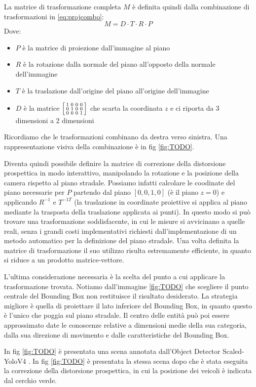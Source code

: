 La matrice di trasformazione completa $M$ è definita quindi dalla combinazione di trasformazioni in \ref{eq:projcombo}:
\begin{equation}
    \label{eq:projcombo}
    M = D \cdot T \cdot R \cdot P
\end{equation}
Dove:
\begin{itemize}
    \item $P$ è la matrice di proiezione dall'immagine al piano
    \item $R$ è la rotazione dalla normale del piano all'opposto della normale dell'immagine
    \item $T$ è la traslazione dall'origine del piano all'origine dell'immagine
    \item $D$ è la matrice 
    $
    \begin{bsmallmatrix}
        1 & 0 & 0 & 0 \\
        0 & 1 & 0 & 0 \\
        0 & 0 & 0 & 1 \\
    \end{bsmallmatrix}
    $
    che scarta la coordinata $z$ e ci riporta da 3 dimensioni a 2 dimensioni
\end{itemize}
Ricordiamo che le trasformazioni combinano da destra verso sinistra.
Una rappresentazione visiva della combinazione è in fig \ref{fig:TODO}.

Diventa quindi possibile definire la matrice di correzione della distorsione prospettica in modo interattivo, manipolando la rotazione e la posizione della camera rispetto al piano stradale.
Possiamo infatti calcolare le coodinate del piano necessarie per $P$ partendo dal piano $[0, 0, 1, 0]$ (è il piano $z=0$) e applicando $R^{-1}$ e $T^{-1T}$ (la traslazione in coordinate proiettive si applica al piano mediante la trasposta della traslazione applicata ai punti).
In questo modo si può trovare una trasformazione soddisfacente, in cui le misure si avvicinano a quelle reali, senza i grandi costi implementativi richiesti dall'implementazione di un metodo automatico per la definizione del piano stradale.
Una volta definita la matrice di trasformazione il suo utilizzo risulta estremamente efficiente, in quanto si riduce a un prodotto matrice-vettore.

L'ultima considerazione necessaria è la scelta del punto a cui applicare la trasformazione trovata.
Notiamo dall'immagine \ref{fig:TODO} che scegliere il punto centrale del Bounding Box non restituisce il risultato desiderato.
La strategia migliore è quella di proiettare il lato inferiore del Bounding Box, in quanto questo è l'unico che poggia sul piano stradale.
Il centro delle entità può poi essere approssimato date le conoscenze relative a dimensioni medie della sua categoria, dalla sua direzione di movimento e dalle caratteristiche del Bounding Box.

In fig \ref{fig:TODO} è presentata una scena annotata dall'Object Detector Scaled-YoloV4 \cite{cspyolo}.
In fig \ref{fig:TODO} è presentata la stessa scena dopo che è stata eseguita la correzione della distorsione prospettica, in cui la posizione dei veicoli è indicata dal cerchio verde.
